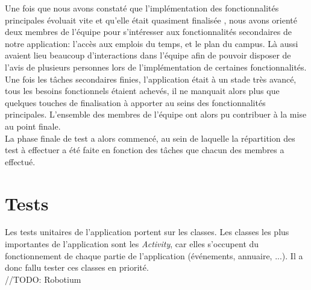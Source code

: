 Une fois que nous avons constaté que l’implémentation des fonctionnalités principales évoluait vite et qu’elle était quasiment finalisée , nous avons orienté deux membres de l’équipe pour s’intéresser aux fonctionnalités secondaires de notre application: l’accès aux emplois du temps, et le plan du campus. Là aussi avaient lieu beaucoup d'interactions dans l’équipe afin de pouvoir disposer de l’avis de plusieurs personnes lors de l’implémentation de certaines fonctionnalités.\\
Une fois les tâches secondaires finies, l’application était à un stade très avancé, tous les besoins fonctionnels  étaient achevés, il ne manquait alors plus que quelques touches de finalisation à apporter au seins des fonctionnalités principales. L’ensemble des membres de l’équipe ont alors pu contribuer à la mise au point finale.\\
La phase finale de test a alors commencé, au sein de laquelle la répartition des test à effectuer a été faite en fonction des tâches que chacun des membres a effectué.

\section{Tests}
Les tests unitaires de l’application portent sur les classes. Les classes les plus importantes de l’application sont les \emph{Activity}, car elles s’occupent du fonctionnement de chaque partie de l’application (événements, annuaire, ...). Il a donc fallu tester ces classes en priorité.\\
//TODO: Robotium